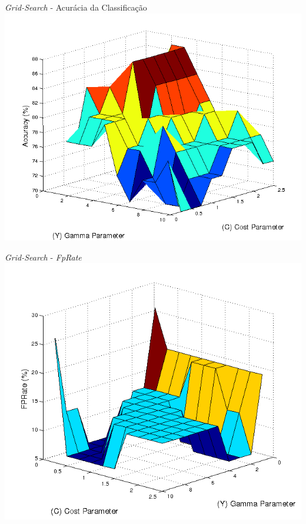 \documentclass{beamer}
\begin{document}
\begin{frame}{\textit{Grid-Search} - Acurácia da Classificação}
      \includegraphics[scale=0.5]{./img/gridsearch.png}      
\end{frame}

\begin{frame}{\textit{Grid-Search} - \textit{FpRate}}
      \includegraphics[scale=0.5]{./img/gridsearchfprate.png}
\end{frame}
\end{document}
